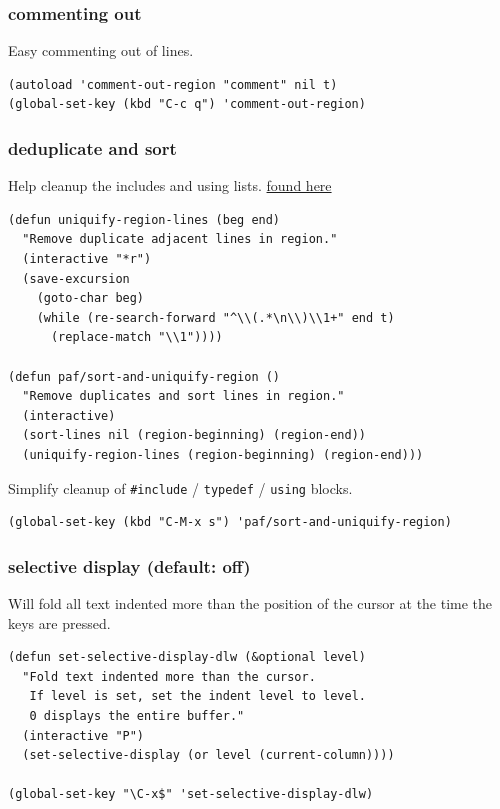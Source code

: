 \documentclass[11pt]{article}
\begin{document}
\subsubsection{commenting out}
\label{sec:org0d89a59}
Easy commenting out of lines.

\begin{verbatim}
(autoload 'comment-out-region "comment" nil t)
(global-set-key (kbd "C-c q") 'comment-out-region)
\end{verbatim}

\subsubsection{deduplicate and sort}
\label{sec:org2ee7fbd}
Help cleanup the includes and using lists.
\href{http://www.emacswiki.org/emacs/DuplicateLines}{found here}

\begin{verbatim}
(defun uniquify-region-lines (beg end)
  "Remove duplicate adjacent lines in region."
  (interactive "*r")
  (save-excursion
    (goto-char beg)
    (while (re-search-forward "^\\(.*\n\\)\\1+" end t)
      (replace-match "\\1"))))

(defun paf/sort-and-uniquify-region ()
  "Remove duplicates and sort lines in region."
  (interactive)
  (sort-lines nil (region-beginning) (region-end))
  (uniquify-region-lines (region-beginning) (region-end)))
\end{verbatim}

Simplify cleanup of \texttt{\#include} / \texttt{typedef} / \texttt{using} blocks.

\begin{verbatim}
(global-set-key (kbd "C-M-x s") 'paf/sort-and-uniquify-region)
\end{verbatim}
\subsubsection{selective display (default: off)}
\label{sec:org29c0edb}
Will fold all text indented more than the position of the cursor at
the time the keys are pressed.

\begin{verbatim}
(defun set-selective-display-dlw (&optional level)
  "Fold text indented more than the cursor.
   If level is set, set the indent level to level.
   0 displays the entire buffer."
  (interactive "P")
  (set-selective-display (or level (current-column))))

(global-set-key "\C-x$" 'set-selective-display-dlw)
\end{verbatim}
\end{document}
